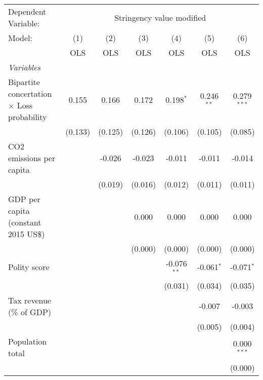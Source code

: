 
\begingroup
\centering
\begin{tabular}{lcccccc}
   \toprule
   Dependent Variable: & \multicolumn{6}{c}{Stringency value modified}\\
   Model:                                            & (1)     & (2)     & (3)     & (4)           & (5)          & (6)\\  
                                                     &  OLS    & OLS     & OLS     & OLS           & OLS          & OLS\\  
   \midrule
   \emph{Variables}\\
   Bipartite concertation $\times$ Loss probability  & 0.155   & 0.166   & 0.172   & 0.198$^{*}$   & 0.246$^{**}$ & 0.279$^{***}$\\   
                                                     & (0.133) & (0.125) & (0.126) & (0.106)       & (0.105)      & (0.085)\\   
   CO2 emissions per capita                          &         & -0.026  & -0.023  & -0.011        & -0.011       & -0.014\\   
                                                     &         & (0.019) & (0.016) & (0.012)       & (0.011)      & (0.011)\\   
   GDP per capita (constant 2015 US\$)               &         &         & 0.000   & 0.000         & 0.000        & 0.000\\   
                                                     &         &         & (0.000) & (0.000)       & (0.000)      & (0.000)\\   
   Polity score                                      &         &         &         & -0.076$^{**}$ & -0.061$^{*}$ & -0.071$^{*}$\\   
                                                     &         &         &         & (0.031)       & (0.034)      & (0.035)\\   
   Tax revenue (\% of GDP)                           &         &         &         &               & -0.007       & -0.003\\   
                                                     &         &         &         &               & (0.005)      & (0.004)\\   
   Population total                                  &         &         &         &               &              & 0.000$^{***}$\\   
                                                     &         &         &         &               &              & (0.000)\\   

\end{tabular}
